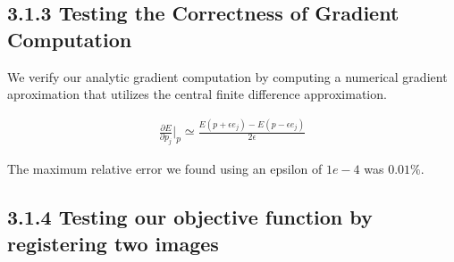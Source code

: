 \documentclass{article}
\begin{document}
\begin{par}
		\subsection*{3.1.3 Testing the Correctness of Gradient Computation}
			We verify our analytic gradient computation by computing a numerical gradient aproximation that utilizes the central finite difference approximation.

			\begin{align*}
				\frac{\partial E}{\partial p_{j}} |_{p} \simeq  \frac{E(p + \epsilon e_{j}) - E(p - \epsilon e_{j})}{2 \epsilon}
			\end{align*}
			
			
			The maximum relative error we found using an epsilon of $1e-4$ was $0.01\%$.
		
		\subsection*{3.1.4 Testing our objective function by registering two images}
		
		
	\end{par}
	
\end{document}
